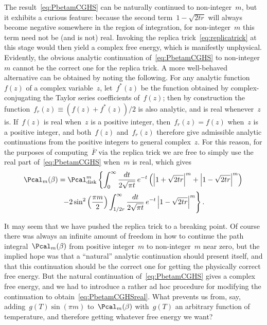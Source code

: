 \documentclass[12pt]{article}
\begin{document}
The result~\eqref{eq:PbetamCGHS} can be naturally continued to non-integer~$m$, but it exhibits a curious feature: because the second term~$1-\sqrt{2tr}$ will always become negative somewhere in the region of integration, for non-integer~$m$ this term need not be (and is not) real.  Invoking the replica trick~\eqref{eq:replicatrick} at this stage would then yield a complex free energy, which is manifestly unphysical.  Evidently, the obvious analytic continuation of~\eqref{eq:PbetamCGHS} to non-integer~$m$ cannot be the correct one for the replica trick.  A more well-behaved alternative can be obtained by noting the following.  For any analytic function~$f(z)$ of a complex variable~$z$, let~$f^*(z)$ be the function obtained by complex-conjugating the Taylor series coefficients of~$f(z)$; then by construction the function~$f_r(z) \equiv (f(z) + f^*(z))/2$ is also analytic, and is real whenever~$z$ is.  If~$f(z)$ is real when~$z$ is a positive integer, then~$f_r(z) = f(z)$ when~$z$ is a positive integer, and both~$f(z)$ and~$f_r(z)$ therefore give admissible analytic continuations from the positive integers to general complex~$z$.  For this reason, for the purposes of computing~$\overline{F}$ via the replica trick we are free to simply use the real part of~\eqref{eq:PbetamCGHS} when~$m$ is real, which gives
\begin{multline}
\label{eq:PbetamCGHSreal}
\Pcal_m(\beta) = \Pcal_\mathrm{disk}^m \left\{\int_0^\infty \frac{dt}{2\sqrt{\pi t}} \, e^{-t} \left(\left|1+\sqrt{2tr}\right|^m + \left|1-\sqrt{2tr}\right|^m\right) \right. \\ \left. - 2 \sin^2\left(\frac{\pi m}{2}\right) \int_{1/2r}^\infty \frac{dt}{2\sqrt{\pi t}} \, e^{-t} \left|1-\sqrt{2tr}\right|^m \right\}.
\end{multline}

It may seem that we have pushed the replica trick to a breaking point.  Of course there was always an infinite amount of freedom in how to continue the path integral~$\Pcal_m(\beta)$ from positive integer~$m$ to non-integer~$m$ near zero, but the implied hope was that a ``natural'' analytic continuation should present itself, and that this continuation should be the correct one for getting the physically correct free energy.  But the natural continuation of~\eqref{eq:PbetamCGHS} gives a complex free energy, and we had to introduce a rather ad hoc procedure for modifying the continuation to obtain~\eqref{eq:PbetamCGHSreal}.  What prevents us from, say, adding~$g(T) \sin(\pi m)$ to~$\Pcal_m(\beta)$ with~$g(T)$ an arbitrary function of temperature, and therefore getting whatever free energy we want?
\end{document}
